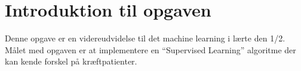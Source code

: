 \documentclass[14pt]{article}
\begin{document}
    \clearpage

    \maketitle{}              %
    \thispagestyle{empty}   %
    \newpage                %

\section*{Introduktion til opgaven}
Denne opgave er en videreudvidelse til det machine learning i lærte den 1/2.
Målet med opgaven er at implementere en ``Supervised Learning'' algoritme der
kan kende forskel på kræftpatienter.
\end{document}
